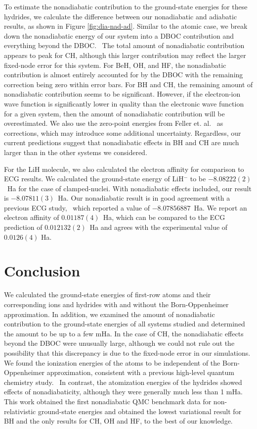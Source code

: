 \documentclass[aip,jcp,numerical,reprint]{revtex4-1}
\begin{document}
To estimate the nonadiabatic contribution to the ground-state energies for these hydrides, we calculate the difference between our nonadiabatic and adiabatic results, as shown in Figure \ref{fig:dia-nad-ad}. Similar to the atomic case, we break down the nonadiabatic energy of our system into a DBOC contribution and everything beyond the DBOC.~\cite{CFOUR,Harding,Feller_DBOC} The total amount of nonadiabatic contribution appears to peak for CH, although this larger contribution may reflect the larger fixed-node error for this system. For BeH, OH, and HF, the nonadiabatic contribution is almost entirely accounted for by the DBOC with the remaining correction being zero within error bars. For BH and CH, the remaining amount of nonadiabatic contribution seems to be significant. However, if the electron-ion wave function is significantly lower in quality than the electronic wave function for a given system, then the amount of nonadiabatic contribution will be overestimated. We also use the zero-point energies from Feller et. al.~\cite{Feller_Corrections} as corrections, which may introduce some additional uncertainty.  Regardless, our current predictions suggest that nonadiabatic effects in BH and CH are much larger than in the other systems we considered.

For the LiH molecule, we also calculated the electron affinity for comparison to ECG results. We calculated the ground-state energy of LiH$^-$ to be $-8.08222(2)$~Ha for the case of clamped-nuclei. With nonadiabatic effects included, our result is  $-8.07811(3)$~Ha. Our nonadiabatic result is in good agreement with a previous ECG study,~\cite{Bubin_LiH_noBO} which reported a value of $-8.07856887$~Ha. We report an electron affinity of $0.01187(4)$~Ha, which can be compared to the ECG prediction of $0.012132(2)$~Ha and agrees with the experimental value of $0.0126(4)$ Ha.~\cite{switch}

\section{Conclusion}
We calculated the ground-state energies of first-row atoms and their corresponding ions and hydrides with and without the Born-Oppenheimer approximation. In addition, we examined the amount of nonadiabatic contribution to the ground-state energies of all systems studied and determined the amount to be up to a few mHa. In the case of CH, the nonadiabatic effects beyond the DBOC were unusually large, although we could not rule out the possibility that this discrepancy is due to the fixed-node error in our simulations. %
We found the ionization energies of the atoms to be independent of the Born-Oppenheimer approximation, consistent with a previous high-level quantum chemistry study.~\cite{Klopper_IP} In contrast, the atomization energies of the hydrides showed effects of nonadiabaticity, although they were generally much less than 1 mHa. This work obtained the first nonadiabatic QMC benchmark data for non-relativistic ground-state energies and obtained the lowest variational result for BH and the only results for CH, OH and HF, to the best of our knowledge.
\end{document}
